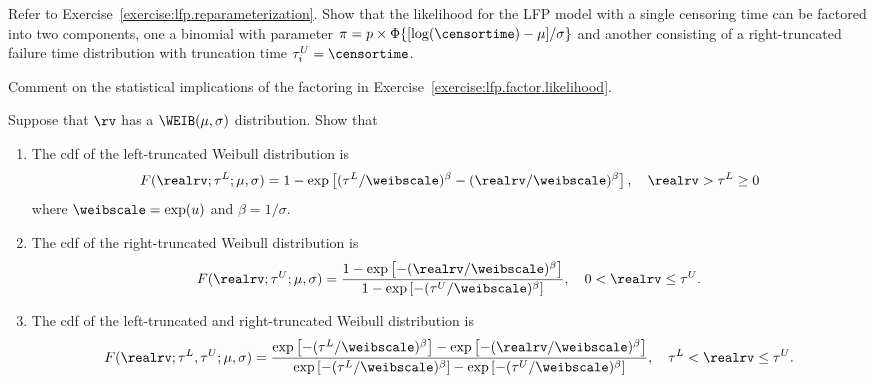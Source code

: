 \begin{exercise}
\label{exercise:lfp.factor.likelihood}
Refer to Exercise~\ref{exercise:lfp.reparameterization}.  Show that
the likelihood for the LFP model with a single censoring time can be
factored into two components, one a binomial with parameter $\pi=p
\times \Phi\{[\log(\censortime)-\mu]/\sigma\}$ and another consisting
of a right-truncated failure time distribution with truncation time
$\tau_{i}^{U}=\censortime$.
\end{exercise}


\begin{exercise1}
Comment on the statistical implications of the factoring in
Exercise~\ref{exercise:lfp.factor.likelihood}.
\end{exercise1}


\begin{exercise}
\label{exercise:trun.dist}
Suppose that $\rv$ has a $\WEIB(\mu, \sigma)$ distribution.
Show that
\begin{enumerate}
\item
\label{exer.part:left.truncated.cdf}
The cdf of the left-truncated Weibull distribution is 
\begin{displaymath}
F(\realrv;\tau^{L}; \mu,\sigma)=
1-\exp
\left [
(\tau^{L}/\weibscale)^{\beta}-(\realrv/\weibscale)^{\beta}
\right ], \quad \realrv>\tau^{L} \ge 0
\end{displaymath}
where $\weibscale=\exp(u)$ and $\beta=1/\sigma$.
\item
\label{exer.part:right.truncated.cdf}
The cdf of the right-truncated Weibull distribution is 
\begin{displaymath}
F(\realrv; \tau^{U}; \mu,\sigma)=
\frac{
1-\exp \left [-(\realrv/\weibscale)^{\beta} \right ]
    }
    {
1-\exp \left [-(\tau^{U}/\weibscale)^{\beta} \right ]
    },\quad 0< \realrv \le \tau^{U}.
\end{displaymath}
\item
\label{exer.part:left.right.truncated.cdf}
The cdf of the left-truncated and right-truncated Weibull
distribution is
\begin{displaymath}
F(\realrv; \tau^{L},\tau^{U}; \mu,\sigma)=
\frac{
 \exp \left [-(\tau^{L}/\weibscale)^{\beta} \right ]
-\exp \left [-(\realrv/\weibscale)^{\beta} \right ]
    }
    {
 \exp \left [-(\tau^{L}/\weibscale)^{\beta} \right ]
-\exp \left [-(\tau^{U}/\weibscale)^{\beta} \right ]
    },\quad \tau^{L}< \realrv \le \tau^{U}.
\end{displaymath}
\end{enumerate}
\end{exercise}

